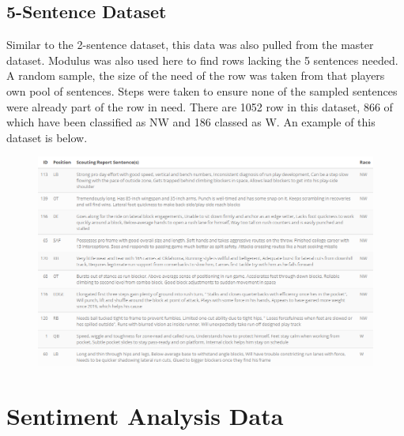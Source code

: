 \documentclass[oneside,12pt]{Classes/RoboticsLaTeX}
\begin{document}
\subsection{5-Sentence Dataset}
Similar to the 2-sentence dataset, this data was also pulled from the master dataset. Modulus was also used here to find rows lacking the 5 sentences needed. A random sample, the size of the need
of the row was taken from that players own pool of sentences. Steps were taken to ensure none of the sampled sentences were already part of the row in need. There are 1052 row in this dataset, 866 
of which have been classified as NW and 186 classed as W. An example of this dataset is below.

\begin{figure}[!htb]
  \centering
  \begin{minipage}{1\textwidth}
    \centering
    \includegraphics[width=1\linewidth]{Figures/5_sentence.png}
    \label{fig:5-sentence_dataset_sample}
  \end{minipage}%
\end{figure}


\section{Sentiment Analysis Data}
\label{sec:senti_data}
\end{document}
